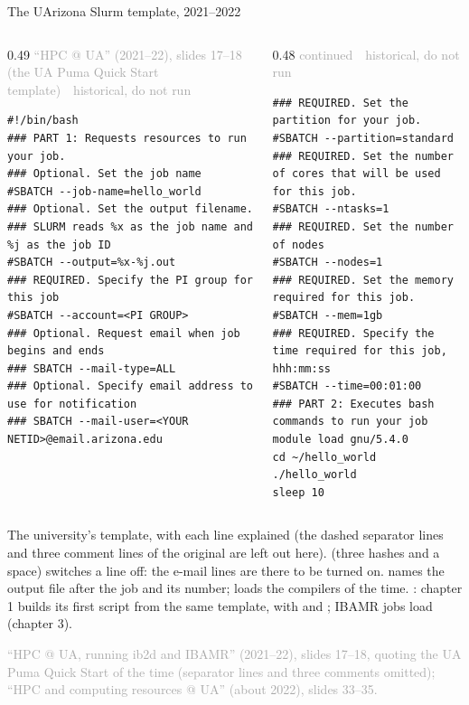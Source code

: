 \documentclass[aspectratio=169,11pt]{beamer}
\newcommand{\sourcecredit}[1]{\vfill\begin{flushright}\tiny\textcolor{DarkGray}{#1}\end{flushright}}
\newcommand{\hist}[1]{{\tiny\sffamily\textcolor{DarkGray}{#1\ \textbullet\ historical, do not run}}\par\nointerlineskip\vspace{0.3mm}}
\begin{document}
\begin{frame}[fragile]{The UArizona Slurm template, 2021--2022}
\label{fr:uatemplate}
\begin{columns}[T,onlytextwidth]
\begin{column}{0.49\textwidth}
\hist{``HPC @ UA'' (2021--22), slides 17--18 (the UA Puma Quick Start template)}
\begin{lstlisting}[style=hist]
#!/bin/bash
### PART 1: Requests resources to run your job.
### Optional. Set the job name
#SBATCH --job-name=hello_world
### Optional. Set the output filename.
### SLURM reads %x as the job name and %j as the job ID
#SBATCH --output=%x-%j.out
### REQUIRED. Specify the PI group for this job
#SBATCH --account=<PI GROUP>
### Optional. Request email when job begins and ends
### SBATCH --mail-type=ALL
### Optional. Specify email address to use for notification
### SBATCH --mail-user=<YOUR NETID>@email.arizona.edu
\end{lstlisting}
\end{column}
\begin{column}{0.48\textwidth}
\hist{continued}
\begin{lstlisting}[style=hist]
### REQUIRED. Set the partition for your job.
#SBATCH --partition=standard
### REQUIRED. Set the number of cores that will be used for this job.
#SBATCH --ntasks=1
### REQUIRED. Set the number of nodes
#SBATCH --nodes=1
### REQUIRED. Set the memory required for this job.
#SBATCH --mem=1gb
### REQUIRED. Specify the time required for this job, hhh:mm:ss
#SBATCH --time=00:01:00
### PART 2: Executes bash commands to run your job
module load gnu/5.4.0
cd ~/hello_world
./hello_world
sleep 10
\end{lstlisting}
\end{column}
\end{columns}
\vspace{1mm}
\scriptsize The university's template, with each line explained (the dashed separator lines and three comment lines of the original are left out here).  (three hashes and a space) switches a line off: the e-mail lines are there to be turned on.  names the output file after the job and its number;  loads the compilers of the time. : chapter 1 builds its first script from the same template, with  and ; IBAMR jobs load  (chapter 3).
\sourcecredit{``HPC @ UA, running ib2d and IBAMR'' (2021--22), slides 17--18, quoting the UA Puma Quick Start of the time (separator lines and three comments omitted); ``HPC and computing resources @ UA'' (about 2022), slides 33--35.}
\end{frame}
\end{document}
